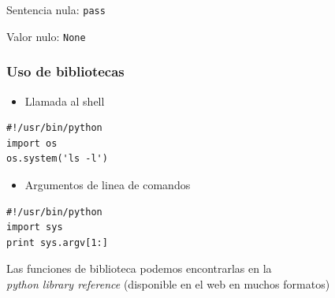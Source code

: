 \documentclass{beamer}
\begin{document}
\begin{frame}[fragile]
 
Sentencia nula: \verb|pass|

Valor nulo: \verb|None| 

\end{frame}


\begin{frame}[fragile]
\frametitle{Uso de bibliotecas}



\begin{itemize}
\item  Llamada al shell
\end{itemize}


  \begin{footnotesize}
\begin{verbatim}
#!/usr/bin/python
import os
os.system('ls -l')
\end{verbatim}
  \end{footnotesize}

\begin{itemize}
\item Argumentos de linea de comandos
\end{itemize}



  \begin{footnotesize}
\begin{verbatim}
#!/usr/bin/python
import sys
print sys.argv[1:]

\end{verbatim}
  \end{footnotesize}
Las funciones de biblioteca podemos encontrarlas
en la \\\emph{python library reference}
(disponible en el web en muchos formatos)
\end{frame}








\end{document}
